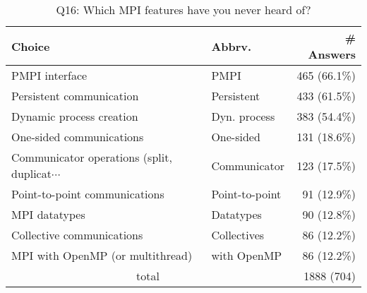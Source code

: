 \begin{table}[htb]%
\begin{center}%
\caption{Q16: Which MPI features have you never heard of?}%
\label{tab:Q16-ans}%
\begin{tabular}{l|l|r}%
\hline%
Choice & Abbrv. & \# Answers \\%
\hline%
PMPI interface & PMPI & 465 (66.1\%) \\%
Persistent communication & Persistent & 433 (61.5\%) \\%
Dynamic process creation & Dyn. process & 383 (54.4\%) \\%
One-sided communications & One-sided & 131 (18.6\%) \\%
{\small Communicator operations (split, duplicat$\cdots$} & Communicator & 123 (17.5\%) \\%
Point-to-point communications & Point-to-point & 91 (12.9\%) \\%
MPI datatypes & Datatypes & 90 (12.8\%) \\%
Collective communications & Collectives & 86 (12.2\%) \\%
MPI with OpenMP (or multithread) & with OpenMP & 86 (12.2\%) \\%
\hline%
\multicolumn{2}{c}{total} & 1888 (704)\\%
\hline%
\end{tabular}%
\end{center}%
\end{table}%
